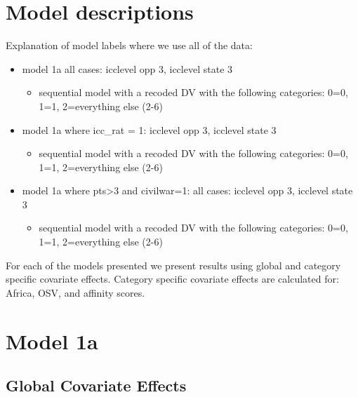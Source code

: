 \documentclass[]{article}
\begin{document}
\tableofcontents

\clearpage

\section{Model descriptions}

Explanation of model labels where we use all of the data:

\begin{itemize}
	\item model 1a all cases: icclevel opp 3, icclevel state 3
	\begin{itemize}
		\item sequential model with a recoded DV with the following categories: 0=0, 1=1, 2=everything else (2-6)
	\end{itemize}	
	\item model 1a where icc_rat = 1: icclevel opp 3, icclevel state 3
	\begin{itemize}
		\item sequential model with a recoded DV with the following categories: 0=0, 1=1, 2=everything else (2-6)
	\end{itemize}	
	\item model 1a where pts>3 and civilwar=1: all cases: icclevel opp 3, icclevel state 3
	\begin{itemize}
		\item sequential model with a recoded DV with the following categories: 0=0, 1=1, 2=everything else (2-6)
	\end{itemize}			
\end{itemize}

For each of the models presented we present results using global and category specific covariate effects. Category specific covariate effects are calculated for: Africa, OSV, and affinity scores.

\section{Model 1a}
\subsection{Global Covariate Effects}

\clearpage
\end{document}
